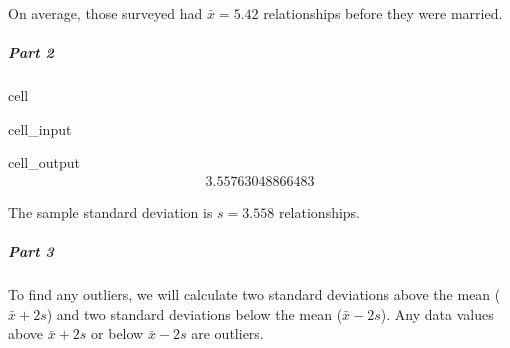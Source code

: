 \documentclass[letterpaper,10pt,english]{jupyterBook}
\begin{document}
\sphinxAtStartPar
On average, those surveyed had \(\bar{x} = 5.42\) relationships before they were married.


\subparagraph{Part 2}
\label{\detokenize{Ch2 Descriptive Statistics/2.3 Measures of Dispersion:id7}}
\begin{sphinxuseclass}{cell}\begin{sphinxVerbatimInput}

\begin{sphinxuseclass}{cell_input}
\begin{sphinxVerbatim}[commandchars=\\\{\}]
\end{sphinxVerbatim}

\end{sphinxuseclass}\end{sphinxVerbatimInput}
\begin{sphinxVerbatimOutput}

\begin{sphinxuseclass}{cell_output}\begin{equation*}
\begin{split}3.55763048866483\end{split}
\end{equation*}
\end{sphinxuseclass}\end{sphinxVerbatimOutput}

\end{sphinxuseclass}
\sphinxAtStartPar
The sample standard deviation is \(s = 3.558\) relationships.


\subparagraph{Part 3}
\label{\detokenize{Ch2 Descriptive Statistics/2.3 Measures of Dispersion:part-3}}
\sphinxAtStartPar
To find any outliers, we will calculate two standard deviations above the mean (\(\bar{x} + 2s\)) and two standard deviations below the mean (\(\bar{x} - 2s\)). Any data values above \(\bar{x} + 2s\) or below \(\bar{x} - 2s\) are outliers.
\end{document}
